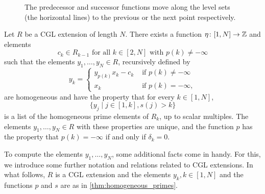 \begin{figure}
	\centering
	\caption{The predecessor and successor functions move along the level sets (the horizontal lines) to the previous or the next point respectively.}
	\label{fig:predecessor_successor}
\end{figure}

\begin{theorem}\label{thm:homogeneous_primes}
	Let $R$ be a CGL extension of length $N$. There exists a function $\eta \colon [1, N] \to \mathbb{Z}$ and elements
	\begin{equation*}
		c_k \in R_{k-1} \text{ for all } k \in [2,N] \text{ with } p(k) \neq - \infty
	\end{equation*}
	such that the elements $y_1, \dots, y_N \in R$, recursively defined by
	\begin{equation*}
		y_k = \begin{cases}
			y_{p(k)}x_k - c_k & \text{ if } p(k) \neq -\infty \\
			x_k               & \text{ if } p(k) = -\infty,
		\end{cases}
	\end{equation*}
	are homogeneous and have the property that for every $k \in [1, N]$,
	\begin{equation}\label{eq:list_of_ys_in_R_k}
		\{y_j \mid j \in [1, k], s(j) > k\}
	\end{equation}
	is a list of the homogeneous prime elements of $R_k$, up to scalar multiples. The
	elements $y_1, \dots, y_N \in R$ with these properties are unique, and the function $p$
	has the property that $p(k) = - \infty$ if and only if $\delta_k = 0$.
\end{theorem}

To compute the elements $y_1, \dots, y_N$, some additional facts come in handy. For
this, we introduce some further notation and relations related to CGL extensions. In
what follows, $R$ is a CGL extension and the elements $y_k, k \in [1, N]$ and the
functions $p$ and $s$ are as in \cref{thm:homogeneous_primes}.

